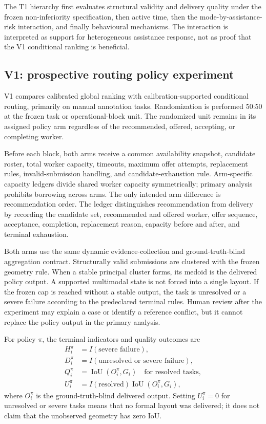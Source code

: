 The T1 hierarchy first evaluates structural validity and delivery quality under the frozen non-inferiority specification, then active time, then the mode-by-assistance-risk interaction, and finally behavioural mechanisms. The interaction is interpreted as support for heterogeneous assistance response, not as proof that the V1 conditional ranking is beneficial.

\subsection{V1: prospective routing policy experiment}

V1 compares calibrated global ranking with calibration-supported conditional routing, primarily on manual annotation tasks. Randomization is performed 50:50 at the frozen task or operational-block unit. The randomized unit remains in its assigned policy arm regardless of the recommended, offered, accepting, or completing worker.

Before each block, both arms receive a common availability snapshot, candidate roster, total worker capacity, timeouts, maximum offer attempts, replacement rules, invalid-submission handling, and candidate-exhaustion rule. Arm-specific capacity ledgers divide shared worker capacity symmetrically; primary analysis prohibits borrowing across arms. The only intended arm difference is recommendation order. The ledger distinguishes recommendation from delivery by recording the candidate set, recommended and offered worker, offer sequence, acceptance, completion, replacement reason, capacity before and after, and terminal exhaustion.

Both arms use the same dynamic evidence-collection and ground-truth-blind aggregation contract. Structurally valid submissions are clustered with the frozen geometry rule. When a stable principal cluster forms, its medoid is the delivered policy output. A supported multimodal state is not forced into a single layout. If the frozen cap is reached without a stable output, the task is unresolved or a severe failure according to the predeclared terminal rules. Human review after the experiment may explain a case or identify a reference conflict, but it cannot replace the policy output in the primary analysis.

For policy $\pi$, the terminal indicators and quality outcomes are
\begin{align}
 H_i^\pi &= I(\text{severe failure}),\\
 D_i^\pi &= I(\text{unresolved or severe failure}),\\
 Q_i^\pi &= \operatorname{IoU}(O_i^\pi,G_i)
             \quad\text{for resolved tasks},\\
 U_i^\pi &= I(\text{resolved})
             \operatorname{IoU}(O_i^\pi,G_i),
 \label{eq:v1outcomes}
\end{align}
where $O_i^\pi$ is the ground-truth-blind delivered output. Setting $U_i^\pi=0$ for unresolved or severe tasks means that no formal layout was delivered; it does not claim that the unobserved geometry has zero IoU.

